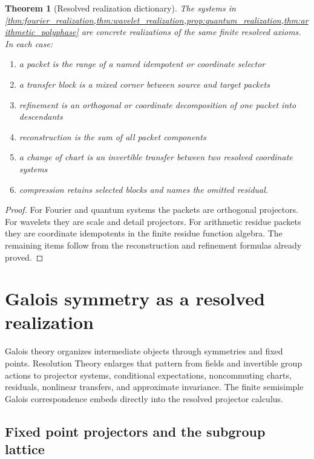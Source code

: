 \documentclass{aomart}
\newtheorem{theorem}{Theorem}[section]
\theoremstyle{definition}
\theoremstyle{remark}
\begin{document}
\begin{theorem}[Resolved realization dictionary]\label{thm:realization_dictionary}
The systems in \cref{thm:fourier_realization,thm:wavelet_realization,prop:quantum_realization,thm:arithmetic_polyphase} are concrete realizations of the same finite resolved axioms. In each case:
\begin{enumerate}
\item a packet is the range of a named idempotent or coordinate selector
\item a transfer block is a mixed corner between source and target packets
\item refinement is an orthogonal or coordinate decomposition of one packet into descendants
\item reconstruction is the sum of all packet components
\item a change of chart is an invertible transfer between two resolved coordinate systems
\item compression retains selected blocks and names the omitted residual.
\end{enumerate}
\end{theorem}

\begin{proof}
For Fourier and quantum systems the packets are orthogonal projectors. For wavelets they are scale and detail projectors. For arithmetic residue packets they are coordinate idempotents in the finite residue function algebra. The remaining items follow from the reconstruction and refinement formulas already proved.
\end{proof}


\section{Galois symmetry as a resolved realization}\label{sec:galois_realization}

Galois theory organizes intermediate objects through symmetries and fixed points. Resolution Theory enlarges that pattern from fields and invertible group actions to projector systems, conditional expectations, noncommuting charts, residuals, nonlinear transfers, and approximate invariance. The finite semisimple Galois correspondence embeds directly into the resolved projector calculus.

\subsection{Fixed point projectors and the subgroup lattice}
\end{document}
